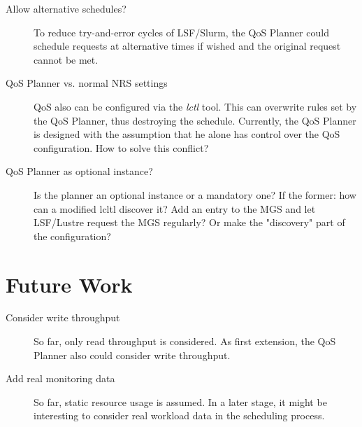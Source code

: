 \documentclass[10pt]{article}
\begin{document}
\begin{description}
 \item[Allow alternative schedules?] To reduce try-and-error cycles of LSF/Slurm, the QoS Planner could schedule requests at alternative times if wished and the original request cannot be met.

 \item[QoS Planner vs. normal NRS settings] QoS also can be configured via the \emph{lctl} tool.
 This can overwrite rules set by the QoS Planner, thus destroying the schedule.
 Currently, the QoS Planner is designed with the assumption that he alone has control over the QoS configuration.
 How to solve this conflict?

 \item[QoS Planner as optional instance?] Is the planner an optional instance or a mandatory one?
 If the former: how can a modified lcltl discover it?
 Add an entry to the MGS and let LSF/Lustre request the MGS regularly?
 Or make the "discovery" part of the configuration?
\end{description}


\section{Future Work}

\begin{description}
 \item[Consider write throughput] So far, only read throughput is considered. As first extension, the QoS Planner also could consider write throughput.
 \item[Add real monitoring data] So far, static resource usage is assumed. In a later stage, it might be interesting to consider real workload data in the scheduling process.
\end{description}
\end{document}
